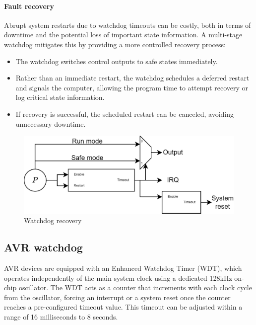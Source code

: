 \paragraph*{Fault recovery}
Abrupt system restarts due to watchdog timeouts can be costly, both in terms of downtime and the potential loss of important state information. A multi-stage watchdog mitigates this by providing a more controlled recovery process:
\begin{itemize}
    \item The watchdog switches control outputs to safe states immediately.
    \item Rather than an immediate restart, the watchdog schedules a deferred restart and signals the computer, allowing the program time to attempt recovery or log critical state information.
    \item If recovery is successful, the scheduled restart can be canceled, avoiding unnecessary downtime.
\end{itemize}
\begin{figure}[H]
    \centering
    \includegraphics[width=0.75\linewidth]{images/wdog2.png}
    \caption{Watchdog recovery}
\end{figure}

\subsection{AVR watchdog}
AVR devices are equipped with an Enhanced Watchdog Timer (WDT), which operates independently of the main system clock using a dedicated 128kHz on-chip oscillator. 
The WDT acts as a counter that increments with each clock cycle from the oscillator, forcing an interrupt or a system reset once the counter reaches a pre-configured timeout value. 
This timeout can be adjusted within a range of 16 milliseconds to 8 seconds.

